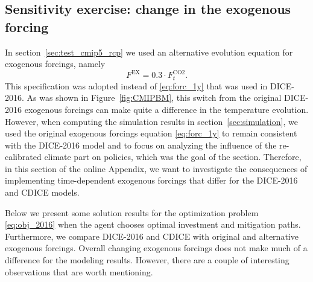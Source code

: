 \documentclass[11pt, a4paper, pdftex, twoside, dvipsnames]{article}
\renewcommand{\ref}{\cref}
\begin{document}
\begin{appendices}
\section{Sensitivity exercise: change in the exogenous forcing}
\label{sec:fex}

In section~\ref{sec:test_cmip5_rcp} we used an alternative evolution equation for exogenous forcings, namely 
\begin{equation}
    F^{\text{EX}} = 0.3 \cdot F^{\text{CO2}}_t.
\end{equation}
This specification was adopted instead of \cref{eq:forc_1y} that was used in DICE-2016. As was shown in Figure~\ref{fig:CMIPBM}, this switch from the original DICE-2016 exogenous forcings can make quite a difference in the temperature evolution. However, when computing the simulation results in section~\ref{sec:simulation}, we used the original exogenous forcings equation \cref{eq:forc_1y} to remain consistent with the DICE-2016 model and to focus on analyzing the influence of the re-calibrated climate part on policies, which was the goal of the section. Therefore, in this section of the online Appendix, we want to investigate the consequences of implementing time-dependent exogenous forcings that  differ for the DICE-2016 and CDICE models. 


Below we present some solution results for the optimization problem \cref{eq:obj_2016} when the agent chooses optimal investment and mitigation paths. Furthermore, we compare DICE-2016 and CDICE with original and alternative exogenous forcings. Overall changing exogenous forcings does not make much of a difference for the modeling results. However, there are a couple of interesting observations that are worth mentioning.


\end{appendices}
\end{document}
